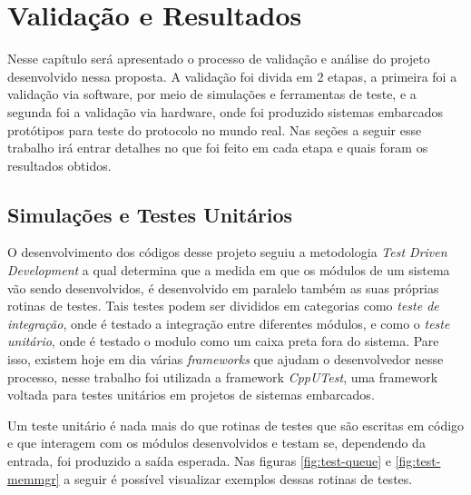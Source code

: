 \chapter{Validação e Resultados}

Nesse capítulo será apresentado o processo de validação e análise do projeto
desenvolvido nessa proposta. A validação foi divida em 2 etapas, a primeira
foi a validação via software, por meio de simulações e ferramentas de teste,
e a segunda foi a validação via hardware, onde foi produzido sistemas embarcados
protótipos para teste do protocolo no mundo real. Nas seções a seguir esse
trabalho irá entrar detalhes no que foi feito em cada etapa e quais foram
os resultados obtidos.

\section{Simulações e Testes Unitários}

O desenvolvimento dos códigos desse projeto seguiu a metodologia \textit{Test Driven Development}
a qual determina que a medida em que os módulos de um sistema vão sendo desenvolvidos, é desenvolvido
em paralelo também as suas próprias rotinas de testes. Tais testes podem ser divididos em categorias
como \textit{teste de integração}, onde é testado a integração entre diferentes módulos, e como o
\textit{teste unitário}, onde é testado o modulo como um caixa preta fora do sistema. Pare isso,
existem hoje em dia várias \textit{frameworks} que ajudam o desenvolvedor nesse processo,
nesse trabalho foi utilizada a framework \textit{CppUTest}, uma framework voltada para
testes unitários em projetos de sistemas embarcados.

Um teste unitário é nada mais do que rotinas de testes que são escritas em código e que
interagem com os módulos desenvolvidos e testam se, dependendo da entrada, foi produzido
a saída esperada. Nas figuras \ref{fig:test-queue} e \ref{fig:test-memmgr} a seguir é possível
visualizar exemplos dessas rotinas de testes.

